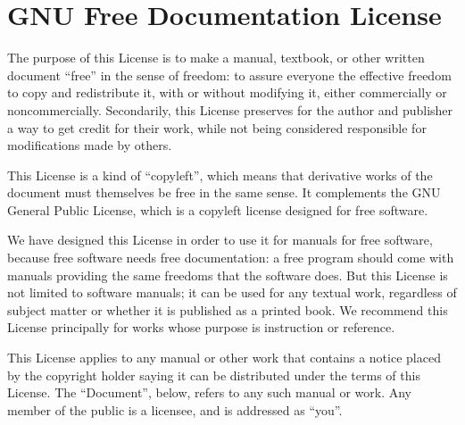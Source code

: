\chapter{GNU Free Documentation License}
\label{fdl}

    


    

      The purpose of this License is to make a manual, textbook, or
      other written document ``free'' in the sense of
      freedom: to assure everyone the effective freedom to copy and
      redistribute it, with or without modifying it, either
      commercially or noncommercially. Secondarily, this License
      preserves for the author and publisher a way to get credit for
      their work, while not being considered responsible for
      modifications made by others.
    

    
    

      This License is a kind of ``copyleft'', which means
      that derivative works of the document must themselves be free in
      the same sense. It complements the GNU General Public License,
      which is a copyleft license designed for free software.
    

    
    

      We have designed this License in order to use it for manuals for
      free software, because free software needs free documentation: a
      free program should come with manuals providing the same
      freedoms that the software does. But this License is not limited
      to software manuals; it can be used for any textual work,
      regardless of subject matter or whether it is published as a
      printed book. We recommend this License principally for works
      whose purpose is instruction or reference.
    

	


    

      This License applies to any manual or other work that contains a
      notice placed by the copyright holder saying it can be
      distributed under the terms of this License. The
      ``Document'', below, refers to any such manual or
      work. Any member of the public is a licensee, and is addressed
      as ``you''.
    

    
    

